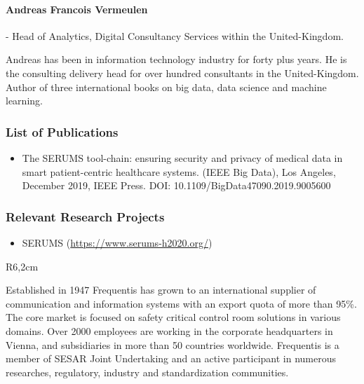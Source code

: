 \documentclass[a4paper,11pt]{article}
\begin{document}
\vspace{10pt}

\paragraph{Andreas Francois Vermeulen} - Head of Analytics, Digital Consultancy Services within the United-Kingdom.

Andreas has been in information technology industry for forty plus years. He is the consulting delivery head for over hundred consultants in the United-Kingdom. Author of three international books on big data, data science and machine learning.
     

\subsubsection*{List of Publications}

\begin{itemize}
\item The SERUMS tool-chain: ensuring security and privacy of medical data in smart patient-centric healthcare systems. (IEEE Big Data), Los Angeles, December 2019, IEEE Press. DOI: 10.1109/BigData47090.2019.9005600
\end{itemize}

\subsubsection*{Relevant Research Projects}
\begin{itemize}
\item SERUMS (\url{https://www.serums-h2020.org/})
\end{itemize}


\begin{wrapfigure}{R}{6,2cm}
\vspace{-3cm}
\hfill {}
\vspace{-1cm}
\end{wrapfigure}
\vspace{10pt}

Established in 1947 Frequentis has grown to an international supplier of communication and information systems with an export quota of more than 95\%. The core market is focused on safety critical control room solutions in various domains. Over 2000 employees are working in the corporate headquarters in Vienna, and subsidiaries in more than 50 countries worldwide. Frequentis is a member of SESAR Joint Undertaking and an active participant in numerous researches, regulatory, industry and standardization communities.
\end{document}
